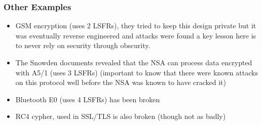 \documentclass{beamer}
\begin{document}
\begin{frame}
   \frametitle{Other Examples}
   \begin{itemize}
    \item GSM encryption (uses 2 LSFRs), they tried to keep this design private but it was eventually reverse engineered and attacks were found \pause a key lesson here is to never rely on security through obscurity. \pause
    \item The Snowden documents revealed that the NSA can process data encrypted with A5/1 (uses 3 LSFRs) \pause (important to know that there were known attacks on this protocol well before the NSA was known to have cracked it) \pause
    \item Bluetooth E0 (uses 4 LSFRs) has been broken \pause
    \item RC4 cypher, used in SSL/TLS is also broken (though not as badly)
   \end{itemize}
\end{frame}

 
\end{document}

